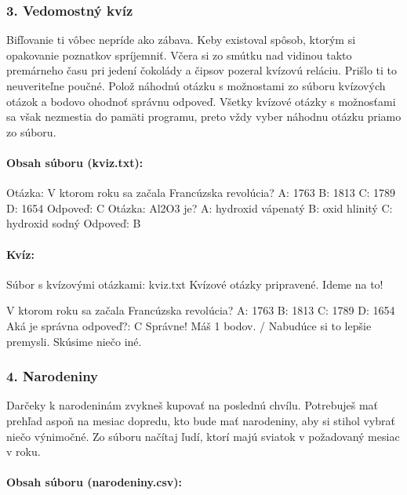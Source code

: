 \subsubsection*{3. Vedomostný kvíz}
Bifľovanie ti vôbec nepríde ako zábava. Keby existoval spôsob, ktorým si opakovanie poznatkov spríjemniť. Včera si zo smútku nad vidinou takto premárneho času pri jedení čokolády a čipsov pozeral kvízovú reláciu. Prišlo ti to neuveriteľne poučné. Polož náhodnú otázku s možnostami zo súboru kvízových otázok a bodovo ohodnoť správnu odpoveď. Všetky kvízové otázky s možnosťami sa však nezmestia do pamäti programu, preto vždy vyber náhodnu otázku priamo zo súboru.

\paragraph{Obsah súboru (kviz.txt):}

\begin{code}
Otázka: V ktorom roku sa začala Francúzska revolúcia?
  A: 1763
  B: 1813
  C: 1789
  D: 1654
Odpoveď: C
Otázka: Al2O3 je?
  A: hydroxid vápenatý
  B: oxid hlinitý
  C: hydroxid sodný
Odpoveď: B
\end{code}

\paragraph{Kvíz:}

\begin{code}
Súbor s kvízovými otázkami: kviz.txt
Kvízové otázky pripravené.
Ideme na to!

V ktorom roku sa začala Francúzska revolúcia?
A: 1763
B: 1813
C: 1789
D: 1654
Aká je správna odpoveď?: C
Správne! Máš 1 bodov. / Nabudúce si to lepšie premysli. Skúsime niečo iné.
\end{code}


\subsubsection*{4. Narodeniny}
Darčeky k narodeninám zvykneš kupovať na poslednú chvílu. Potrebuješ mať prehľad aspoň na mesiac dopredu, kto bude mať narodeniny, aby si stihol vybrať niečo výnimočné. Zo súboru načítaj ľudí, ktorí majú sviatok v požadovaný mesiac v roku.

\paragraph{Obsah súboru (narodeniny.csv):}

